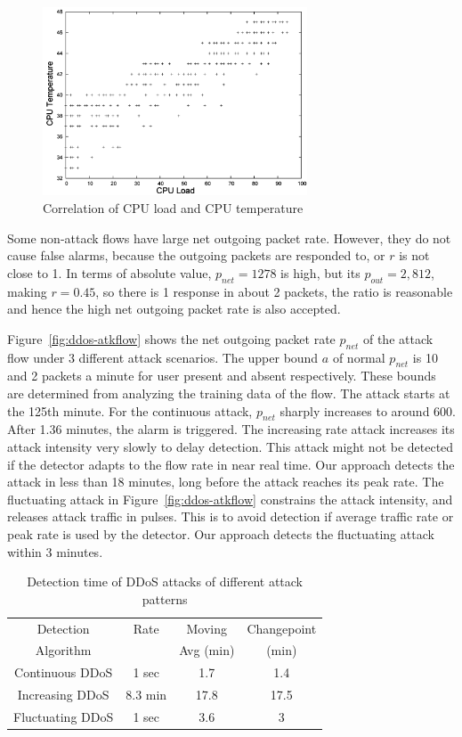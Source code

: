 \begin{figure}[htb]
\centering
\includegraphics[width=0.7\textwidth]{sensor/load-temp.png}
\caption{Correlation of CPU load and CPU temperature}
\label{fig:temp-cpuload}
\end{figure}

Some non-attack flows have large net outgoing packet rate. However,
they do not cause false alarms, because the outgoing packets are
responded to, or $r$ is not close to 1. In terms of absolute value,
$p_{net}=1278$ is high, but its $p_{out}=2,812$, making $r=0.45$, so
there is 1 response in about 2 packets, the ratio is reasonable and
hence the high net outgoing packet rate is also accepted.

Figure~\ref{fig:ddos-atkflow} shows the net outgoing packet rate
$p_{net}$ of the attack flow under 3 different attack scenarios. The
upper bound $a$ of normal $p_{net}$ is 10 and 2 packets a minute for
user present and absent respectively. These bounds are determined
from analyzing the training data of the flow. The attack starts at
the 125th minute. For the continuous attack, $p_{net}$ sharply
increases to around 600. After 1.36 minutes, the alarm is triggered.
The increasing rate attack increases its attack intensity very
slowly to delay detection. This attack might not be detected if the
detector adapts to the flow rate in near real time. Our approach
detects the attack in less than 18 minutes, long before the attack
reaches its peak rate. The fluctuating attack in Figure~\ref{fig:ddos-atkflow}
constrains the attack intensity, and releases attack traffic in
pulses. This is to avoid detection if average traffic rate or peak
rate is used by the detector. Our approach detects the fluctuating
attack within 3 minutes.

\begin{table}[!t]
  \centering
  \begin{tabular}{|c|c|c|c|}
  \hline
  Detection & Rate & Moving & Changepoint \\
  Algorithm & & Avg (min) & (min) \\
  \hline
  Continuous DDoS  & 1 sec & 1.7  & 1.4   \\
  \hline
  Increasing DDoS & 8.3 min & 17.8  & 17.5   \\
  \hline
  Fluctuating DDoS & 1 sec &  3.6  & 3   \\ [0.5ex]
  \hline
  \end{tabular}
  \caption{Detection time of DDoS attacks of different attack patterns}
  \label{tbl:detect-DDoS}
\end{table}


